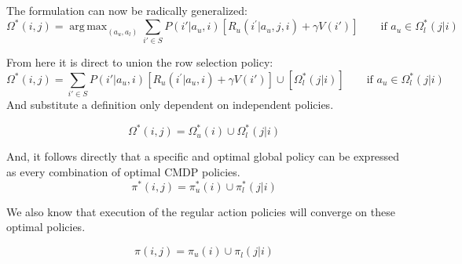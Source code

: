 \documentclass[compsoc,journal,letterpaper,10pt,draftcls,twocolumn]{IEEEtran}
\DeclareMathOperator*{\argmax}{arg\,max}
\begin{document}
The formulation can now be radically generalized:
\begin{equation}
\Omega^{*}\left( i,j \right) =  \argmax_{\left(a_{u},a_{l}\right)}
\sum_{i' \in S} 
P\left( i'|a_{u}, i \right)
\left\lbrack R_{u}\left(  i^{'}|a_{u}, j, i \right)+ \gamma V\left( i' \right) \right\rbrack
\qquad\textrm{if\ }
a_{u} \in\Omega_{l}^{*}\left( j|i \right)
\end{equation}

From here it is direct to union the row selection policy:
\begin{equation}
\Omega^{*}\left( i,j \right) =   \sum_{i' \in S}
P\left( i'|a_{u}, i \right)\left\lbrack R_{u}\left( i^{'}|a_{u}, i \right) + \gamma V\left( i' \right) \right\rbrack \cup \left\lbrack \Omega_{l}^{*}\left( j|i \right) \right\rbrack
\qquad\textrm{if\ }a_{u} \in\Omega_{l}^{*}\left( j|i \right)
\end{equation}
And substitute a definition only dependent on independent policies.
 
\begin{equation}
\Omega^{*}\left( i,j \right) = \Omega_{u}^{*}\left( i \right) \cup \Omega_{l}^{*}\left( j|i \right)
\end{equation}
 
And, it follows directly that a specific and optimal global policy can
be expressed as every combination of optimal CMDP policies.
\begin{equation}
\pi^{*}\left( i,j \right) = \pi_{u}^{*}\left( i \right) \cup \pi_{l}^{*}\left( j|i \right)
\end{equation}

We also know that execution of the regular action policies will converge
on these optimal policies.

\begin{equation}
\pi\left( i,j \right) = \pi_{u}^{\ }\left( i \right) \cup \pi_{l}^{\ }\left( j|i \right)
\end{equation}
\end{document}
